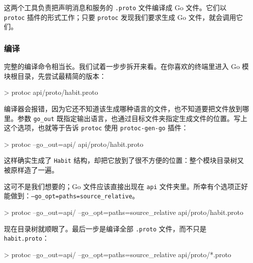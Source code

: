 这两个工具负责把声明消息和服务的 \texttt{.proto} 文件编译成 Go 文件。它们以 \texttt{protoc} 插件的形式工作；只要 \texttt{protoc} 发现我们要求生成 Go 文件，就会调用它们。

\subsubsection{编译}

完整的编译命令相当长。我们试着一步步拆开来看。在你喜欢的终端里进入 Go 模块根目录，先尝试最精简的版本：

\begin{shellcode}[]
> protoc api/proto/habit.proto
\end{shellcode}

编译器会报错，因为它还不知道该生成哪种语言的文件，也不知道要把文件放到哪里。参数 \texttt{go\_out} 既指定输出语言，也通过目标文件夹指定生成文件的位置。写上这个选项，也就等于告诉 \texttt{protoc} 使用 \texttt{protoc-gen-go} 插件：

\begin{shellcode}[]
> protoc --go_out=api/ api/proto/habit.proto
\end{shellcode}

这样确实生成了 \texttt{Habit} 结构，却把它放到了很不方便的位置：整个模块目录树又被原样造了一遍。

\begin{treebox}
\end{treebox}

这可不是我们想要的；Go 文件应该直接出现在 \texttt{api} 文件夹里。所幸有个选项正好能做到：\texttt{--go\_opt=paths=source\_relative}。

\begin{shellcode}[]
> protoc --go_out=api/ --go_opt=paths=source_relative
    api/proto/habit.proto
\end{shellcode}

现在目录树就顺眼了。最后一步是编译全部 \texttt{.proto} 文件，而不只是 \texttt{habit.proto}：

\begin{shellcode}[]
> protoc --go_out=api/ --go_opt=paths=source_relative api/proto/*.proto
\end{shellcode}

